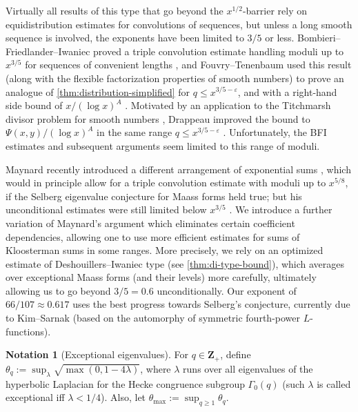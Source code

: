 \documentclass[reqno,11pt]{amsart}
\theoremstyle{definition}
\newtheorem{notation}[theorem]{Notation}
\theoremstyle{remark}
\numberwithin{equation}{section}
\newcommand{\Z}{\mathbf{Z}}
\newcommand{\eps}{\varepsilon}
\begin{document}
Virtually all results of this type that go beyond the $x^{1/2}$-barrier rely on equidistribution estimates for convolutions of sequences, but unless a long smooth sequence is involved, the exponents have been limited to $3/5$ or less. Bombieri--Friedlander--Iwaniec proved a triple convolution estimate handling moduli up to $x^{3/5}$ for sequences of convenient lengths \cite[Theorem 4]{bombieri1986primes}, and Fouvry--Tenenbaum used this result (along with the flexible factorization properties of smooth numbers) to prove an analogue of \cref{thm:distribution-simplified} for $q \le x^{3/5-\eps}$, and with a right-hand side bound of $x/(\log x)^A$ \cite[Th\'eor\`eme 2]{fouvry1982repartition}. Motivated by an application to the Titchmarsh divisor problem for smooth numbers \cite[Th\'eor\`eme 2]{drappeau2015theoremes}, Drappeau improved the bound to $\Psi(x, y)/(\log x)^A$ in the same range $q \le x^{3/5-\eps}$ \cite[Th\'eor\`eme 1]{drappeau2015theoremes}. Unfortunately, the BFI estimates and subsequent arguments seem limited to this range of moduli.

Maynard recently introduced a different arrangement of exponential sums \cite[\S 18]{maynard2020primes}, which would in principle allow for a triple convolution estimate with moduli up to $x^{5/8}$, if the Selberg eigenvalue conjecture for Maass forms \cite{selberg1965estimation,sarnak1995selberg,iwaniec1985character,iwaniec1985density,iwaniec1990small,luo1995selberg} held true; but his unconditional estimates were still limited below $x^{3/5}$ \cite[Proposition 8.3]{maynard2020primes}. We introduce a further variation of Maynard's argument which eliminates certain coefficient dependencies, allowing one to use more efficient estimates for sums of Kloosterman sums in some ranges. More precisely, we rely on an optimized estimate of Deshouillers--Iwaniec type (see \cref{thm:di-type-bound}), which averages over exceptional Maass forms (and their levels) more carefully, ultimately allowing us to go beyond $3/5 = 0.6$ unconditionally. Our exponent of $66/107 \approx 0.617$ uses the best progress towards Selberg's conjecture, currently due to Kim--Sarnak \cite[Appendix 2]{kim2003functoriality} (based on the automorphy of symmetric fourth-power $L$-functions).

\begin{notation}[Exceptional eigenvalues] \label{not:exceptional}
For $q \in \Z_+$, define $\theta_q := \sup_\lambda \sqrt{\max(0,1 - 4\lambda)}$, where $\lambda$ runs over all eigenvalues of the hyperbolic Laplacian for the Hecke congruence subgroup $\Gamma_0(q)$ (such $\lambda$ is called exceptional iff $\lambda < 1/4$). Also, let $\theta_{\max} := \sup_{q \ge 1} \theta_q$. 
\end{notation}
\end{document}

